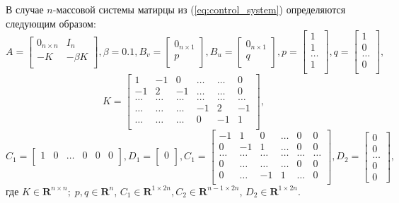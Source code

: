 В случае \(n\)-массовой системы матирцы из (\ref{eq:control_system}) определяются
следующим образом:
$$
A=\begin{bmatrix}
  0_{n \times n}  & I_n\\
  -K  & -\beta K\\
\end{bmatrix}, \beta = 0.1,
B_v=\begin{bmatrix}
0_{n\times 1}       \\
p       \\
\end{bmatrix},
B_u=\begin{bmatrix}
0_{n\times 1}       \\
q       \\
\end{bmatrix},
p = \begin{bmatrix}
1 \\
1 \\
\dots \\
1 \\
\end{bmatrix},
q = \begin{bmatrix}
1 \\
0 \\
\dots \\
0 \\
\end{bmatrix},
$$
$$
K = \begin{bmatrix}
  1  & -1 & 0 & \dots & \dots & 0\\
  -1  & 2 & -1 & \dots & \dots & 0\\
  \dots  & \dots & \dots & \dots & \dots & \dots\\
  \dots  & \dots & \dots & -1 & 2 & -1\\
  \dots  & \dots & \dots & 0 & -1 & 1\\
\end{bmatrix},
$$
$$
C_1=\begin{bmatrix}
1 & 0 & \dots & 0 & 0 & 0 \\
\end{bmatrix},
D_1=\begin{bmatrix}
0 \\
\end{bmatrix},
C_1=\begin{bmatrix}
-1 & 1 & 0 & \dots & 0 & 0 \\
0 & -1 & 1 & \dots & 0 & 0 \\
\dots & \dots & \dots & \dots & \dots & \dots \\
0 & \dots & \dots & \dots & 0 & 0 \\
0 & \dots & -1 & 1 & \dots & 0 \\
\end{bmatrix},
D_2=\begin{bmatrix}
0 \\
0 \\
\dots \\
0 \\
0
\end{bmatrix},
$$
где \(K\in \mathbf{R}^{n\times n};\; p,q\in \mathbf{R}^{n}\), \(C_1\in \mathbf{R}^{1\times 2n}, C_2\in \mathbf{R}^{n-1\times 2n}\),
\(D_2 \in \mathbf{R}^{1\times 2n}\).

